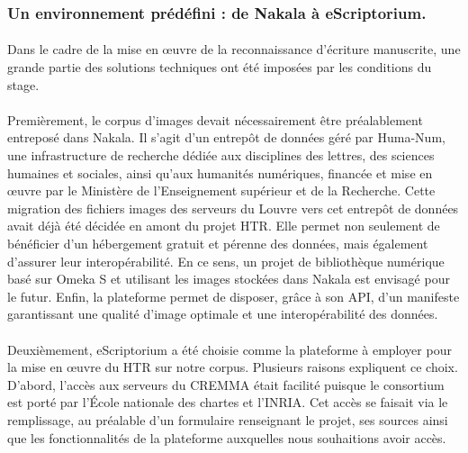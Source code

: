 \documentclass[a4paper,12pt,twoside]{book}
\begin{document}
		\subsubsection{Un environnement prédéfini : de Nakala à eScriptorium.}
		
\paragraph{}
Dans le cadre de la mise en œuvre de la reconnaissance d’écriture manuscrite, une grande partie des solutions techniques ont été imposées par les conditions du stage.

\paragraph{}
Premièrement, le corpus d’images devait nécessairement être préalablement entreposé dans Nakala. Il s'agit d'un entrepôt de données géré par Huma-Num, une infrastructure de recherche dédiée aux disciplines des lettres, des sciences humaines et sociales, ainsi qu’aux humanités numériques, financée et mise en œuvre par le Ministère de l'Enseignement supérieur et de la Recherche. Cette migration des fichiers images des serveurs du Louvre vers cet entrepôt de données avait déjà été décidée en amont du projet HTR. Elle permet non seulement de bénéficier d'un hébergement gratuit et pérenne des données, mais également d'assurer leur interopérabilité. En ce sens, un projet de bibliothèque numérique basé sur Omeka S et utilisant les images stockées dans Nakala est envisagé pour le futur. Enfin, la plateforme permet de disposer, grâce à son API, d’un manifeste garantissant une qualité d’image optimale et une interopérabilité des données. 

\paragraph{}
Deuxièmement, eScriptorium a été choisie comme la plateforme à employer pour la mise en œuvre du HTR sur notre corpus. Plusieurs raisons expliquent ce choix. D’abord, l’accès aux serveurs du CREMMA était facilité puisque le consortium est porté par l’École nationale des chartes et l’INRIA. Cet accès se faisait via le remplissage, au préalable d'un formulaire renseignant le projet, ses sources ainsi que les fonctionnalités de la plateforme auxquelles nous souhaitions avoir accès. 
\end{document}
